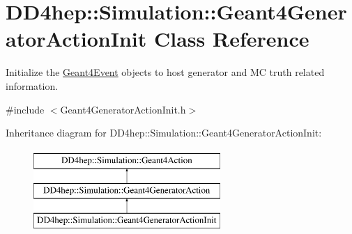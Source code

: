 \hypertarget{class_d_d4hep_1_1_simulation_1_1_geant4_generator_action_init}{}\section{D\+D4hep\+:\+:Simulation\+:\+:Geant4\+Generator\+Action\+Init Class Reference}
\label{class_d_d4hep_1_1_simulation_1_1_geant4_generator_action_init}


Initialize the \hyperlink{class_d_d4hep_1_1_simulation_1_1_geant4_event}{Geant4\+Event} objects to host generator and MC truth related information.  




{\ttfamily \#include $<$Geant4\+Generator\+Action\+Init.\+h$>$}

Inheritance diagram for D\+D4hep\+:\+:Simulation\+:\+:Geant4\+Generator\+Action\+Init\+:\begin{figure}[H]
\begin{center}
\leavevmode
\includegraphics[height=3.000000cm]{class_d_d4hep_1_1_simulation_1_1_geant4_generator_action_init}
\end{center}
\end{figure}
